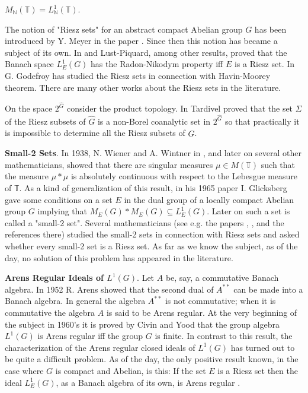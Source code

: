 \documentclass[12pt, twoside, leqno]{article}
\theoremstyle{definition}
\theoremstyle{definition}
\numberwithin{equation}{section}
\begin{document}
 $ M_{\mathbb{N}}(\mathbb{T})=L^{1}_{\mathbb{N}}(\mathbb{T}) $.\vspace{2mm}
 
 \noindent The notion of "Riesz sets" for an abstract compact Abelian group $ G $ has been introduced by Y. Meyer in the paper \cite  {Meyer_01}. Since then this notion has became a subject of its own. In \cite {lust_piq_01} and \cite {lust_piq_02} Lust-Piquard, among other results, proved that the Banach space $ L^{1}_{E}(G) $ has the Radon-Nikodym property iff $ E $ is a Riesz set. In \cite {Godefroy_01}  G. Godefroy has studied the Riesz sets in connection with Havin-Moorey theorem. There are many other works about the Riesz sets in the literature.\vspace{1mm}
 
   On the space $ 2^{\hat{G}} $ consider the product topology. In \cite {Tardivel_01} Tardivel proved that the set $ \Sigma $ of the Riesz subsets of $ \hat{G} $ is a non-Borel coanalytic set in  $ 2^{\hat{G}} $ so that practically it is impossible to determine all the Riesz subsets of $ \hat{G} $.\vspace{2mm}

\textbf{Small-2 Sets}. In 1938, N. Wiener and A. Wintner in \cite {Wiener Wintner}, and later on several other mathematicians, showed that there are singular measures $ \mu\in M(\mathbb{T}) $ such that the measure $ \mu*\mu $ is absolutely continuous with respect to the Lebesgue measure of $ \mathbb{T} $. As a kind of generalization of this result, in his 1965 paper \cite{glicksberg_01}  I. Glicksberg gave some conditions on a set $ E $ in the dual group of a locally compact Abelian group $ G $ implying that $ M_{E}(G)*M_{E}(G)\subseteq L^{1}_{E}(G) $. Later on such a set is called a "small-2 set". Several mathematicians (see e.g. the papers \cite {graham_01}  , \cite {pigno_01} , \cite{Yamaguchi} and the references there) studied the small-2 sets in connection with Riesz sets and asked whether every small-2 set is a Riesz set. As far as we know the subject, as of the day, no solution of this problem has appeared in the literature.\vspace{2mm}

\textbf{Arens Regular Ideals of $ L^{1}(G) $}. Let $ A $ be, say, a commutative Banach algebra. In 1952 R. Arens showed that the second dual of $ A^{**} $ can be made into a Banach algebra. In general the algebra $ A^{**} $ is not commutative; when it is commutative the algebra $ A $ is said to be Arens regular. At the very beginning of the subject in 1960's it is proved by Civin and Yood that the group algebra $ L^{1}(G) $ is Arens regular iff the group $ G $ is finite. In contrast to this result, the characterization of the Arens regular closed ideals of $ L^{1}(G) $ has turned out to be quite a difficult problem. As of the day, the only positive result known, in the case where $ G $ is compact and Abelian, is this: If the set $ E $ is a Riesz set then the ideal $ L_{E}^{1}(G) $, as a Banach algebra of its own, is Arens regular \cite {a_ulger_01}.\vspace{2mm} 
\end{document}
